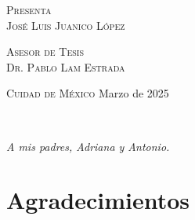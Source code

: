 \vspace{5pt}

\begin{center}
    \begin{minipage}{0.7\textwidth}
        \centering
        {\normalsize\textsc{Presenta}} \\
        {\Large\textsc{José Luis Juanico López}}
        \medskip
    \end{minipage}
\end{center}

\hspace{10pt}

\begin{center}
    \begin{minipage}{0.7\textwidth}
        \centering
        {\normalsize\textsc{Asesor de Tesis}} \\
        {\normalsize\textsc{Dr. Pablo Lam Estrada}}
        \medskip
    \end{minipage}
\end{center}

\vfill

\begin{center}
    \begin{minipage}{0.8\textwidth}
        {\normalsize\textsc{Cuidad de México} \hfill {\small Marzo de 2025}}
    \end{minipage}
\end{center}

\newpage
\thispagestyle{empty}
\

\newpage
{}
\thispagestyle{empty}
\hfill\textit{A mis padres, Adriana y Antonio.}
\newpage
\thispagestyle{empty}
\

\newpage
{}
\thispagestyle{plain}
\section*{Agradecimientos}

